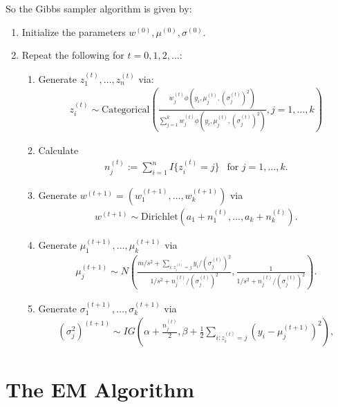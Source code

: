 \documentclass{scrartcl}
\begin{document}
So the Gibbs sampler algorithm is given by:
\begin{enumerate}
\item Initialize the parameters $w^{(0)}, \mu^{(0)}, \sigma^{(0)}$.
\item Repeat the following for $t = 0, 1, 2, \dots$:
  \begin{enumerate}
  \item Generate $z_1^{(t)}, \dots, z_n^{(t)}$ via:
    \begin{align*}
      z_i^{(t)} \sim \text{Categorical} \left(\frac{w_j^{(t)}
  \phi \left(y_i, \mu^{(t)}_j, (\sigma_j^{(t)})^2 \right)}{\sum_{j=1}^k w_j^{(t)}
  \phi \left(y_i, \mu^{(t)}_j, (\sigma_j^{(t)})^2 \right)}, j = 1, \dots, k \right)
    \end{align*}
  \item Calculate
    \begin{align*}
      n_j^{(t)} := \sum_{i=1}^n I\{z_i^{(t)} = j\}  ~~ \text{ for $j =
      1, \dots, k$}.
    \end{align*}
  \item Generate $w^{(t+1)} = (w_1^{(t+1)}, \dots, w_k^{(t+1)})$ via
    \begin{align*}
      w^{(t+1)} \sim \text{Dirichlet}(a_1 + n_1^{(t)}, \dots, a_k +
      n_k^{(t)}). 
    \end{align*}
  \item Generate $\mu_1^{(t+1)}, \dots, \mu_k^{(t+1)}$ via
    \begin{align*}
      \mu_j^{(t+1)} \sim N \left(\frac{m/s^2 + \sum_{i : z^{(t)}_i =
  j} y_i/(\sigma_j^{(t)})^2}{1/s^2 + n_j^{(t)}/(\sigma_j^{(t)})^2},
      \frac{1}{1/s^2 + 
  n^{(t)}_j/(\sigma_j^{(t)})^2} \right). 
    \end{align*}
  \item Generate $\sigma_1^{(t+1)}, \dots, \sigma_k^{(t+1)}$ via
    \begin{align*}
   (\sigma_j^2)^{(t+1)} \sim IG \left(\alpha + \frac{n^{(t)}_j}{2},
  \beta + \frac{1}{2} \sum_{i : z^{(t)}_i = j} (y_i - \mu^{(t+1)}_j)^2 \right), 
    \end{align*}
  \end{enumerate}
\end{enumerate}

\section{The EM Algorithm}
\end{document}
